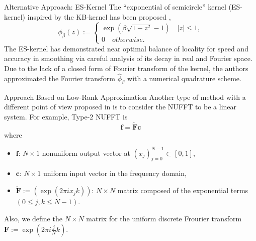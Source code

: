 \documentclass{beamer}
\begin{document}
\begin{frame}{Alternative Approach: ES-Kernel}
  The ``exponential of semicircle'' kernel (ES-kernel) inspired by the KB-kernel has been proposed 
  \cite{SISC-2019-Barnett}, \cite{IEEE-2021-Barnett} 
  \begin{equation}
    \phi_{\beta}(z) :=
    \begin{cases}
      \exp\left(\beta\sqrt{1-z^2} - 1\right) \quad |z| \le 1,\\
      0 \quad otherwise.
    \end{cases}
    \label{eq:ES-kernel}
  \end{equation}
  The ES-kernel has demonstrated near optimal balance of locality for speed and accuracy in smoothing via careful analysis of its decay in real and Fourier space.
  Due to the lack of a closed form of Fourier transform of the kernel, the authors approximated the Fourier transform $\hat{\phi}_{\beta}$ with a numerical quadrature scheme.
\end{frame}

\begin{frame}{Approach Based on Low-Rank Approximation}
  Another type of method with a different point of view proposed in \cite{SISC-2018-Townsend}
  is to consider the NUFFT to be a linear system. For example, Type-$2$ NUFFT is 
  \begin{equation}
    \bm{f} = \tilde{\bm{F}}\bm{c}
    \label{eq:matrix-vector-product-nufft-type-2}
  \end{equation}
  where
  \begin{itemize}
    \item $\bm{f}$: $N \times 1$ nonuniform output vector at $(x_j)_{j=0}^{N-1} \subset [0, 1]$, 
    \item $\bm{c}$: $N \times 1$ uniform input vector in the frequency domain,
    \item $\tilde{\bm{F}} := \left(\exp(2\pi i x_{j}k)\right)$: $N \times N$ matrix composed of the exponential terms
    $(0 \le j, k \le N-1)$.
  \end{itemize}
  Also, we define the $N \times N$ matrix for the uniform discrete Frourier transform
  $\bm{F} := \exp(2\pi i \frac{j}{N}k)$.
\end{frame}
\end{document}
